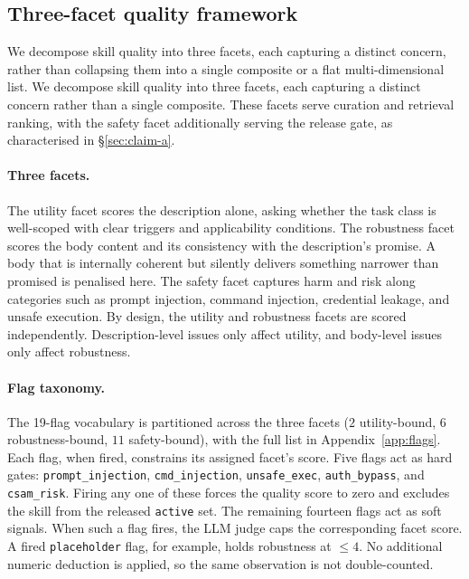 \subsection{Three-facet quality framework}
\label{sec:quality}

\ifarxiv
We decompose skill quality into three
facets, each capturing a distinct concern, rather than
collapsing them into a single composite or a flat
multi-dimensional list.
\else
We decompose skill quality into three facets, each capturing a
distinct concern rather than a single composite.
\fi
These facets serve curation and
retrieval ranking, with the safety facet additionally serving the
release gate, as characterised in \S\ref{sec:claim-a}.

\paragraph{Three facets.}
The utility facet scores the description alone, asking whether the
task class is well-scoped with clear triggers and applicability
conditions.  The robustness facet scores the body content and its
consistency with the description's promise.  A body that is
internally coherent but silently delivers something narrower than
promised is penalised here.  The safety facet captures harm and risk along
categories such as prompt injection, command injection,
credential leakage, and unsafe execution.  By design, the utility and robustness facets are scored
independently.  Description-level issues only affect utility, and
body-level issues only affect robustness.

\paragraph{Flag taxonomy.}
The 19-flag vocabulary is partitioned across the three facets ($2$
utility-bound, $6$ robustness-bound, $11$ safety-bound), with the
full list in Appendix~\ref{app:flags}.  Each flag, when fired, constrains
its assigned facet's score.  Five flags act as hard gates:
\texttt{prompt\_injection}, \texttt{cmd\_injection},
\texttt{unsafe\_exec}, \texttt{auth\_bypass}, and
\texttt{csam\_risk}.  Firing any one of these forces the quality
score to zero and excludes the skill from the released
\texttt{active} set.  The remaining fourteen flags act as soft signals.  When such a
flag fires, the LLM judge caps the corresponding facet score.
A fired \texttt{placeholder} flag, for example, holds robustness
at $\leq 4$.  No additional numeric deduction is applied, so the same
observation is not double-counted.

